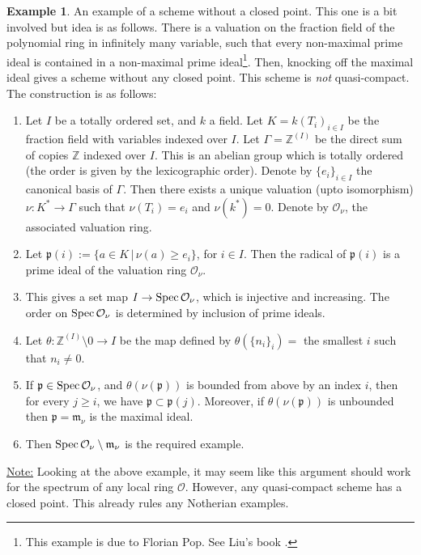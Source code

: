\documentclass[11pt]{amsart}
\newcommand{\Spec}{{\rm Spec \,}}
\newcommand{\sO}{{\mathcal O}}
\newcommand{\Z}{{\mathbb Z}}
\theoremstyle{definition}
\newtheorem{example}[theorem]{Example}
\begin{document}
\begin{example}
	An example of a scheme without a closed point. This one is a bit involved but idea is as follows. There is a valuation on the fraction field of the polynomial ring in infinitely many variable, such that every non-maximal prime ideal is contained in a non-maximal prime ideal\footnote{This example is due to Florian Pop. See Liu's book \cite[\S 3.3, Exercise 3.27]{Liu}.}. Then, knocking off the maximal ideal gives a scheme without any closed point. This scheme is \textit{not} quasi-compact. The construction is as follows:
\begin{enumerate}
	\item Let $I$ be a totally ordered set, and $k$ a field. Let $K=k(T_i)_{i\in I}$ be the fraction field with variables indexed over $I$. Let $\Gamma = \Z^{(I)}$ be the direct sum of copies $\Z$ indexed over $I$. This is an abelian group which is totally ordered (the order is given by the lexicographic order). Denote by $\lbrace e_i \rbrace_{i\in I}$ the canonical basis of $\Gamma$. Then there exists a unique valuation (upto isomorphism) $\nu : K^*\rightarrow \Gamma$ such that $\nu(T_i)=e_i$ and $\nu(k^*)=0$. Denote by $\sO_{\nu}$, the associated valuation ring.
	\item Let $\mathfrak{p}(i):=\lbrace a\in K \,|\, \nu (a)\geq e_i \rbrace$, for $i\in I$. Then the radical of $\mathfrak{p}(i)$ is a prime ideal of the valuation ring $\sO_{\nu}$.
	\item This gives a set map $I \rightarrow \Spec\sO_{\nu}$, which is injective and increasing. The order on $\Spec\sO_{\nu}$ is determined by inclusion of prime ideals.
	\item Let $\theta:\Z^{(I)}\setminus 0\rightarrow I$ be the map defined by  $\theta(\lbrace n_i\rbrace_i)=$ the smallest $i$ such that $n_i\neq 0$.
	\item If $\mathfrak{p}\in \Spec\sO_{\nu}$, and $\theta(\nu(\mathfrak{p}))$ is bounded from above by an index $i$, then for every $j\geq i$, we have $\mathfrak{p}\subset \mathfrak{p}(j)$. Moreover, if $\theta(\nu(\mathfrak{p}))$ is unbounded then $\mathfrak{p}=\mathfrak{m}_{\nu}$ is the maximal ideal.
	\item Then $\Spec\sO_{\nu}\setminus \mathfrak{m}_{\nu}$ is the required example.
\end{enumerate}
	
\end{example}

\underline{Note:} Looking at the above example, it may seem like this argument should work for the spectrum of any local ring $\sO$. However, any quasi-compact scheme has a closed point. This already rules any Notherian examples.
\end{document}

